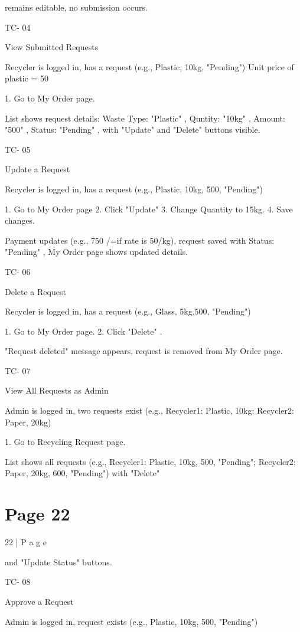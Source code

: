 \documentclass{article}
\begin{document}
remains 
editable, no 
submission 
occurs. 
 
TC-
04 
 
View 
Submitted 
Requests 
 
Recycler is logged 
in, has a request 
(e.g., Plastic, 
10kg,  "Pending") 
Unit price of 
plastic = 50 
 
1. Go to My Order page. 
 
List shows 
request details: 
Waste Type: 
"Plastic" , 
Quntity: "10kg" , 
Amount: "500" , 
Status: 
"Pending" , with 
"Update" and 
"Delete" buttons 
visible. 
 
TC-
05 
 
Update a 
Request 
 
Recycler is logged 
in, has a request 
(e.g., Plastic, 
10kg, 500, 
"Pending") 
 
1. Go to My Order page 
2. Click "Update" 
3. Change Quantity to 
15kg. 
4. Save changes. 
 
Payment 
updates (e.g., 
750 /=if rate is 
50/kg), request 
saved with 
Status: 
"Pending" , My 
Order page 
shows updated 
details. 
 
TC-
06 
 
Delete a 
Request 
 
Recycler is logged 
in, has a request 
(e.g., Glass, 
5kg,500, 
"Pending") 
 
1. Go to My Order page. 
2. Click "Delete" . 
 
"Request 
deleted" 
message 
appears, request 
is removed from 
My Order page. 
 
TC-
07 
 
View All 
Requests as 
Admin 
 
Admin is logged 
in, two requests 
exist (e.g., 
Recycler1: 
Plastic, 10kg; 
Recycler2: Paper, 
20kg) 
 
1. Go to Recycling Request 
page. 
 
List shows all 
requests (e.g., 
Recycler1: 
Plastic, 10kg, 
500, "Pending"; 
Recycler2: 
Paper, 20kg, 
600, "Pending") 
with "Delete" 

\section*{Page 22}
22 | P a g e 
 
and "Update 
Status" buttons. 
 
TC-
08 
 
Approve a 
Request 
 
Admin is logged 
in, request exists 
(e.g., Plastic, 
10kg, 500, 
"Pending") 
 
\end{document}
